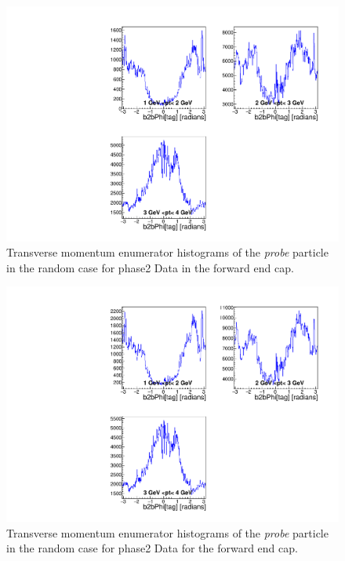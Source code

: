 \documentclass[a4paper,11pt,twosided,final,german,openbib,pdftex,listof=totoc,bibliography=totoc]{scrbook}
\begin{document}
\begin{appendix}
\begin{figure}[!htbp]
	\centering
	\includegraphics[width=\textwidth]{Plots/master/xPtMPhiRandomFCE_Data}
	\caption[Transverse Momentum $\phi$ Random Forward End Cap Enumerator Histogram Phase2 Data]{Transverse momentum enumerator histograms of the \textit{probe} particle in the random case for phase2 Data in the forward end cap.}
	\label{plt:PtMPhiRandomFCE_Data}
\end{figure}

\begin{figure}[!htbp]
	\centering
	\includegraphics[width=\textwidth]{Plots/master/xPtMPhiRandomFCD_Data}
	\caption[Transverse Momentum $\phi$ Random Forward End Cap Denominator Histogram Phase2 Data]{Transverse momentum enumerator histograms of the \textit{probe} particle in the random case for phase2 Data for the forward end cap.}
	\label{plt:PtMPhiRandomFCD_Data}
\end{figure}






\end{appendix}
\end{document}
